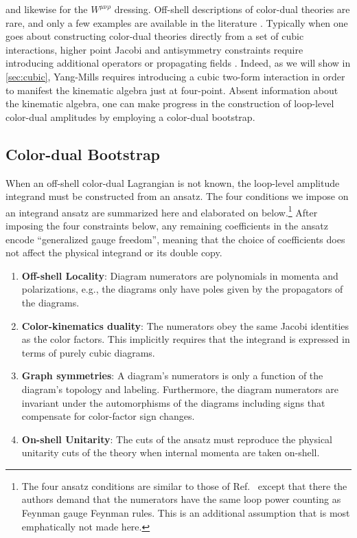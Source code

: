 \documentclass[11pt,letter]{article}
\begin{document}
and likewise for the $W^{\mu \nu \rho}$ dressing.
Off-shell descriptions of
color-dual theories are rare, and only a few examples are available in
the literature \cite{Monteiro2011pc, Cheung:2016prv, Cheung:2021zvb,
  Cheung:2020djz, Ben-Shahar:2022ixa, Ben-Shahar:2021zww,
  Ben-Shahar:2021doh}.
Typically when one goes about constructing color-dual
theories directly from a set of cubic interactions, higher point
Jacobi and antisymmetry constraints require introducing additional operators \cite{Carrasco:2022lbm,Carrasco:2022sck} or propagating fields \cite{Ben-Shahar:2022ixa}.
Indeed, as we will show in \cref{sec:cubic}, Yang-Mills
requires introducing a cubic two-form interaction in order to manifest
the kinematic algebra just at four-point. Absent information about the
kinematic algebra, one can make progress in the construction of
loop-level color-dual amplitudes by employing a color-dual bootstrap.


\subsection{Color-dual Bootstrap}
\label{sec:bootstrap}

When an off-shell color-dual Lagrangian is not known, the loop-level
amplitude integrand must be constructed from an ansatz.  The four
conditions we impose on an integrand ansatz are summarized here and
elaborated on below.\footnote{The four ansatz conditions are similar
  to those of Ref.~\cite{Bern:2015ooa} except that there the authors
  demand that the numerators have the same loop power counting as
  Feynman gauge Feynman rules.  This is an additional assumption that
  is most emphatically not made here.}
After imposing the four constraints below, any remaining coefficients in the ansatz encode ``generalized gauge freedom'', meaning that the
choice of coefficients does not affect the physical integrand or its double copy.
\begin{enumerate}
\item \textbf{Off-shell Locality}: Diagram numerators are polynomials
  in momenta and polarizations, e.g., the diagrams only have poles given
  by the propagators of the diagrams.
\item \textbf{Color-kinematics duality}: The numerators obey the same
  Jacobi identities as the color factors.  This implicitly requires
  that the integrand is expressed in terms of purely cubic diagrams.
\item \textbf{Graph symmetries}: A diagram's numerators is only a
  function of the diagram's topology and labeling.  Furthermore, the
  diagram numerators are invariant under the automorphisms of the
  diagrams including signs that compensate for color-factor sign
    changes.
\item \textbf{On-shell Unitarity}: The cuts of the ansatz must
  reproduce the physical unitarity cuts of the theory when internal
  momenta are taken on-shell.
\end{enumerate}
\end{document}
